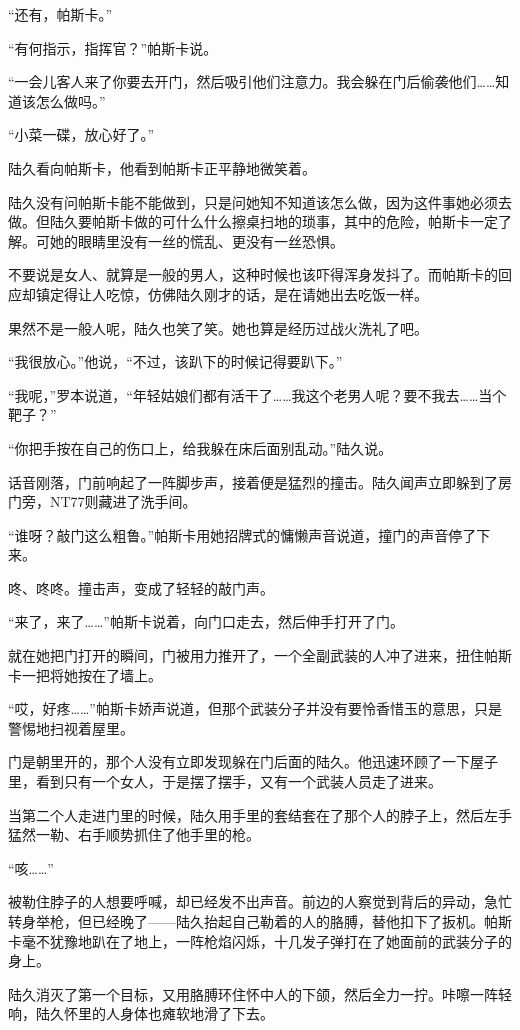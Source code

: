 “还有，帕斯卡。”

“有何指示，指挥官？”帕斯卡说。

“一会儿客人来了你要去开门，然后吸引他们注意力。我会躲在门后偷袭他们……知道该怎么做吗。”

“小菜一碟，放心好了。”

陆久看向帕斯卡，他看到帕斯卡正平静地微笑着。

陆久没有问帕斯卡能不能做到，只是问她知不知道该怎么做，因为这件事她必须去做。但陆久要帕斯卡做的可什么什么擦桌扫地的琐事，其中的危险，帕斯卡一定了解。可她的眼睛里没有一丝的慌乱、更没有一丝恐惧。

不要说是女人、就算是一般的男人，这种时候也该吓得浑身发抖了。而帕斯卡的回应却镇定得让人吃惊，仿佛陆久刚才的话，是在请她出去吃饭一样。

果然不是一般人呢，陆久也笑了笑。她也算是经历过战火洗礼了吧。

“我很放心。”他说，“不过，该趴下的时候记得要趴下。”

“我呢，”罗本说道，“年轻姑娘们都有活干了……我这个老男人呢？要不我去……当个靶子？”

“你把手按在自己的伤口上，给我躲在床后面别乱动。”陆久说。

话音刚落，门前响起了一阵脚步声，接着便是猛烈的撞击。陆久闻声立即躲到了房门旁，NT77则藏进了洗手间。

“谁呀？敲门这么粗鲁。”帕斯卡用她招牌式的慵懒声音说道，撞门的声音停了下来。

咚、咚咚。撞击声，变成了轻轻的敲门声。

“来了，来了……”帕斯卡说着，向门口走去，然后伸手打开了门。

就在她把门打开的瞬间，门被用力推开了，一个全副武装的人冲了进来，扭住帕斯卡一把将她按在了墙上。

“哎，好疼……”帕斯卡娇声说道，但那个武装分子并没有要怜香惜玉的意思，只是警惕地扫视着屋里。

门是朝里开的，那个人没有立即发现躲在门后面的陆久。他迅速环顾了一下屋子里，看到只有一个女人，于是摆了摆手，又有一个武装人员走了进来。

当第二个人走进门里的时候，陆久用手里的套结套在了那个人的脖子上，然后左手猛然一勒、右手顺势抓住了他手里的枪。

“咳……”

被勒住脖子的人想要呼喊，却已经发不出声音。前边的人察觉到背后的异动，急忙转身举枪，但已经晚了——陆久抬起自己勒着的人的胳膊，替他扣下了扳机。帕斯卡毫不犹豫地趴在了地上，一阵枪焰闪烁，十几发子弹打在了她面前的武装分子的身上。

陆久消灭了第一个目标，又用胳膊环住怀中人的下颌，然后全力一拧。咔嚓一阵轻响，陆久怀里的人身体也瘫软地滑了下去。


